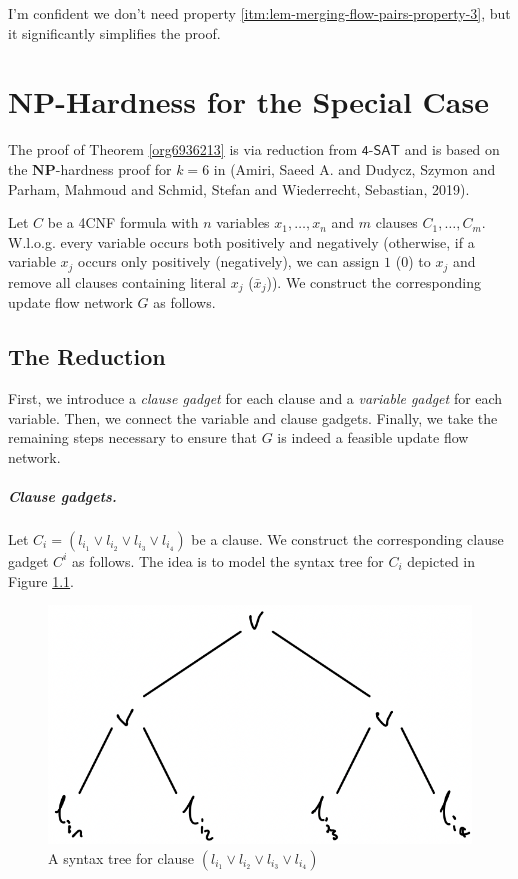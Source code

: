 \documentclass[fontsize=11pt,paper=a4]{book}
\begin{document}
\begin{remark}
I'm confident we don't need property \ref{itm:lem-merging-flow-pairs-property-3}, but it significantly simplifies the proof.
\end{remark}

\chapter{\(\textbf{NP}\)-Hardness for the Special Case}
\label{sec:orgf8bd9dd}

The proof of Theorem \ref{org6936213} is via reduction from \(\textsf{4-SAT}\) and is based on the \(\textbf{NP}\)-hardness proof for \(k=6\) in (Amiri, Saeed A. and Dudycz, Szymon and Parham, Mahmoud and Schmid, Stefan and Wiederrecht, Sebastian, 2019).

Let \(C\) be a 4CNF formula with \(n\) variables \(x_1,\dots,x_n\) and \(m\) clauses \(C_1,\dots,C_m\).
W.l.o.g. every variable occurs both positively and negatively (otherwise, if a variable \(x_j\) occurs only positively (negatively), we can assign \(1\) (\(0\)) to \(x_j\) and remove all clauses containing literal \(x_j\) (\(\bar{x}_j\))).
We construct the corresponding update flow network \(G\) as follows.

\section{The Reduction}
\label{sec:org09c9a06}

First, we introduce a \emph{clause gadget} for each clause and a \emph{variable gadget} for each variable.
Then, we connect the variable and clause gadgets.
Finally, we take the remaining steps necessary to ensure that \(G\) is indeed a feasible update flow network.

\paragraph{Clause gadgets.}
Let \(C_i=(l_{i_1}\vee l_{i_2}\vee l_{i_3}\vee l_{i_4})\) be a clause.
We construct the corresponding clause gadget \(C^i\) as follows.
The idea is to model the syntax tree for \(C_i\) depicted in Figure \ref{fig:orgd1a4915}.

\begin{figure}[htbp]
\centering
\includegraphics[width=.9\linewidth]{../assets/Screen Shot 2023-02-14 at 15.05.37.png}
\caption{\label{fig:orgd1a4915}A syntax tree for clause \((l_{i_1}\vee l_{i_2}\vee l_{i_3}\vee l_{i_4})\)}
\end{figure}
\end{document}
